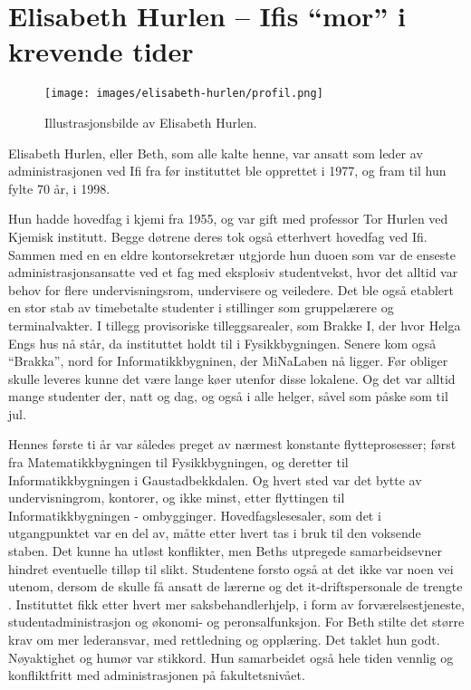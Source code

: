 \chapter[Elisabeth Hurlen]{Elisabeth Hurlen – Ifis ``mor'' i krevende tider}

\author{Skrevet av Narve Trædal}

\begin{wrapfigure}{l}{7cm}
	\centering
	\texttt{[image: images/elisabeth-hurlen/profil.png]}
	\label{fig:elisabeth-hurlen}
	\caption{Illustrasjonsbilde av Elisabeth Hurlen.}
\end{wrapfigure}

Elisabeth Hurlen, eller Beth, som alle kalte henne, var ansatt som leder av administrasjonen ved Ifi fra før instituttet ble opprettet i 1977, og fram til hun fylte 70 år, i 1998.

Hun hadde hovedfag i kjemi fra 1955, og var gift med professor Tor Hurlen ved Kjemisk institutt. Begge døtrene deres tok også etterhvert hovedfag ved Ifi. Sammen med en en eldre kontorsekretær utgjorde hun duoen som var de enseste administrasjonsansatte ved et fag med eksplosiv studentvekst, hvor det alltid var behov for flere undervisningsrom, undervisere og veiledere. Det ble også etablert en stor stab av timebetalte studenter i stillinger som gruppelærere og terminalvakter. I tillegg provisoriske tilleggsarealer, som Brakke I, der hvor Helga Engs hus nå står, da instituttet holdt til i Fysikkbygningen. Senere kom også ``Brakka'', nord for Informatikkbygninen, der MiNaLaben nå ligger. Før obliger skulle leveres kunne det være lange køer utenfor disse lokalene. Og det var alltid mange studenter der, natt og dag, og også i alle helger, såvel som påske som til jul.

Hennes første ti år var således preget av nærmest konstante flytteprosesser; først fra Matematikkbygningen til Fysikkbygningen, og deretter til Informatikkbygningen i Gaustadbekkdalen. Og hvert sted var det bytte av undervisningrom, kontorer, og ikke minst, etter flyttingen til Informatikkbygningen - ombygginger. Hovedfagslesesaler, som det i utgangpunktet var en del av, måtte etter hvert tas i bruk til den voksende staben. Det kunne ha utløst konflikter, men Beths utpregede samarbeidsevner hindret eventuelle tilløp til slikt. Studentene forsto også at det ikke var noen vei utenom, dersom de skulle få ansatt de lærerne og det it-driftspersonale de trengte . Instituttet fikk etter hvert mer saksbehandlerhjelp, i form av forværelsestjeneste, studentadministrasjon og økonomi- og peronsalfunksjon. For Beth stilte det større krav om mer lederansvar, med rettledning og opplæring. Det taklet hun godt. Nøyaktighet og humør var stikkord. Hun samarbeidet også hele tiden vennlig og konfliktfritt med administrasjonen på fakultetsnivået.

